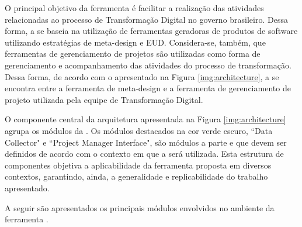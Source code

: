 O principal objetivo da ferramenta é facilitar a realização das atividades relacionadas ao processo de Transformação Digital no governo brasileiro. Dessa forma, a \itractool se baseia na utilização de ferramentas geradoras de produtos de software utilizando estratégias de meta-design e EUD. Considera-se, também, que ferramentas de gerenciamento de projetos são utilizadas como forma de gerenciamento e acompanhamento das atividades do processo de transformação. Dessa forma, de acordo com o apresentado na Figura \ref{img:architecture}, a \itractool se encontra entre a ferramenta de meta-design e a ferramenta de gerenciamento de projeto utilizada pela equipe de Transformação Digital. 

O componente central da arquitetura apresentada na Figura \ref{img:architecture} agrupa os módulos da \itractool. Os módulos destacados na cor verde escuro, ``Data Collector" e ``Project Manager Interface", são módulos a parte e que devem ser definidos de acordo com o contexto em que a \itractool será utilizada. Esta estrutura de componentes objetiva a aplicabilidade da ferramenta proposta em diversos contextos, garantindo, ainda, a generalidade e replicabilidade do trabalho apresentado.

A seguir são apresentados os principais módulos envolvidos no ambiente da ferramenta \itractool.

